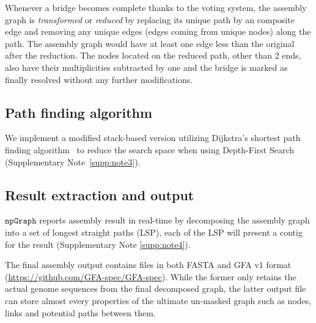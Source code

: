 \documentclass[10pt,twocolumn,twoside]{genpaper}
\newcommand{\npgraph}{$\mathtt{npGraph}$}
\begin{document}
Whenever a bridge becomes complete thanks to the voting system, the assembly graph is \emph{transformed} or \emph{reduced} by replacing its unique path by an composite edge and removing any unique edges (edges coming from unique nodes) along the path. The assembly graph would have at least one edge less than the original after the reduction. The nodes located on the reduced path, other than 2 ends, also have their multiplicities subtracted by one and the bridge is marked as finally resolved without any further modifications. 

\subsection*{Path finding algorithm}

We implement a modified stack-based version utilizing Dijkstra's shortest path finding algorithm~\cite{Dijkstra1959} to reduce the search space when using Depth-First Search (Supplementary Note~\ref{supp:note3}).



\subsection*{Result extraction and output}
\npgraph{} reports assembly result in real-time by decomposing the assembly graph into a set of longest straight paths (LSP), each of the LSP will present a contig for the result (Supplementary Note \ref{supp:note4}).

The final assembly output contains files in both FASTA and GFA v1 format (\url{https://github.com/GFA-spec/GFA-spec}). While the former only retains the actual genome sequences from the final decomposed graph, the latter output file can store almost every properties of the ultimate un-masked graph such as nodes, links and potential paths between them.



 
\end{document}
